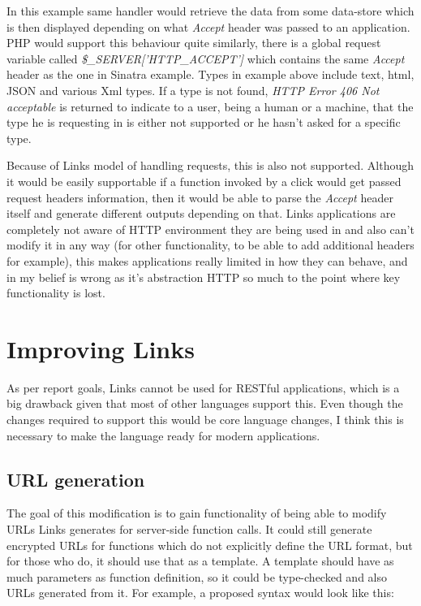 In this example same handler would retrieve the data from some data-store which is then displayed depending on what \textit{Accept} header was passed to an application. PHP would support this behaviour quite similarly, there is a global request variable called \textit{\$\_SERVER['HTTP\_ACCEPT']} which contains the same \textit{Accept} header as the one in Sinatra example. Types in example above include text, html, JSON and various Xml types. If a type is not found, \textit{HTTP Error 406 Not acceptable} is returned to indicate to a user, being a human or a machine, that the type he is requesting in is either not supported or he hasn't asked for a specific type. 

Because of Links model of handling requests, this is also not supported. Although it would be easily supportable if a function invoked by a click would get passed request headers information, then it would be able to parse the \textit{Accept} header itself and generate different outputs depending on that. Links applications are completely not aware of HTTP environment they are being used in and also can't modify it in any way (for other functionality, to be able to add additional headers for example), this makes applications really limited in how they can behave, and in my belief is wrong as it's abstraction HTTP so much to the point where key functionality is lost. 

\section{Improving Links}

As per report goals, Links cannot be used for RESTful applications, which is a big drawback given that most of other languages support this. Even though the changes required to support this would be core language changes, I think this is necessary to make the language ready for modern applications. 

\subsection{URL generation}

The goal of this modification is to gain functionality of being able to modify URLs Links generates for server-side function calls. It could still generate encrypted URLs for functions which do not explicitly define the URL format, but for those who do, it should use that as a template. A template should have as much parameters as function definition, so it could be type-checked and also URLs generated from it. For example, a proposed syntax would look like this:

